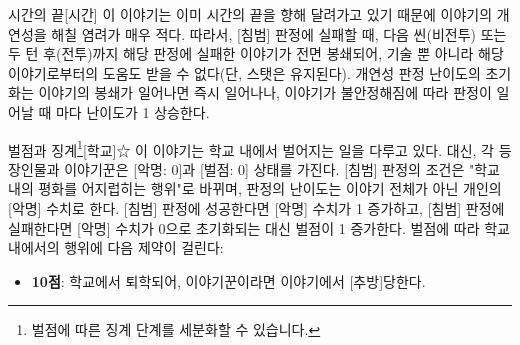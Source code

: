 \documentclass{report}
\begin{document}
	\begin{story}{시간의 끝}{[시간]}
		이 이야기는 이미 시간의 끝을 향해 달려가고 있기 때문에 이야기의 개연성을 해칠 염려가 매우 적다. 따라서, [침범] 판정에 실패할 때, 다음 씬(비전투) 또는 두 턴 후(전투)까지 해당 판정에 실패한 이야기가 전면 봉쇄되어, 기술 뿐 아니라 해당 이야기로부터의 도움도 받을 수 없다(단, 스탯은 유지된다). 개연성 판정 난이도의 초기화는 이야기의 봉쇄가 일어나면 즉시 일어나나, 이야기가 불안정해짐에 따라 판정이 일어날 때 마다 난이도가 1 상승한다.
	\end{story}
	
	\begin{story}{벌점과 징계\footnote{벌점에 따른 징계 단계를 세분화할 수 있습니다.}}{[학교]☆}
		이 이야기는 학교 내에서 벌어지는 일을 다루고 있다. 대신, 각 등장인물과 이야기꾼은 [악명: 0]과 [벌점: 0] 상태를 가진다. [침범] 판정의 조건은 "학교 내의 평화를 어지럽히는 행위"로 바뀌며, 판정의 난이도는 이야기 전체가 아닌 개인의 [악명] 수치로 한다. [침범] 판정에 성공한다면 [악명] 수치가 1 증가하고, [침범] 판정에 실패한다면 [악명] 수치가 0으로 초기화되는 대신 벌점이 1 증가한다. 벌점에 따라 학교 내에서의 행위에 다음 제약이 걸린다:
		\begin{itemize}
			\item \textbf{10점}: 학교에서 퇴학되어, 이야기꾼이라면 이야기에서 [추방]당한다.
		\end{itemize}
	\end{story}
\end{document}
